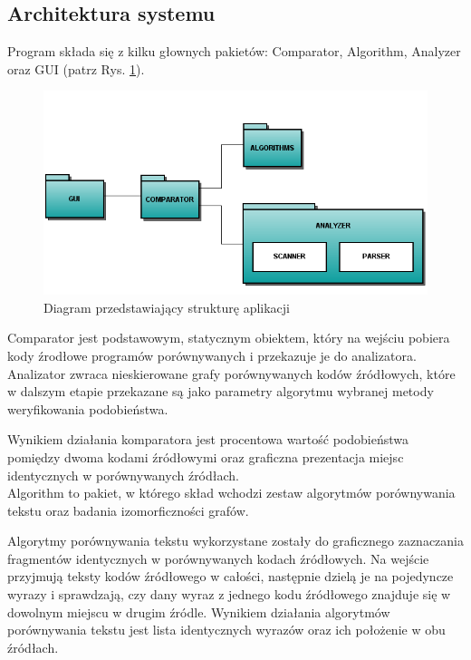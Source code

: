 \documentclass[a4paper,12pt]{article}
\begin{document}
\subsection{Architektura systemu}

Program składa się z kilku głownych pakietów: Comparator, Algorithm, Analyzer oraz GUI (patrz Rys. \ref{fig:gui}).

\begin{figure}[!h]
\centering
\includegraphics[scale=0.65]{gfx/packagediagram.png}
\caption{Diagram przedstawiający strukturę aplikacji}
\label{fig:gui}
\end{figure}

Comparator jest podstawowym, statycznym obiektem, który na wejściu pobiera kody źrodłowe programów porównywanych i przekazuje je do analizatora. Analizator zwraca nieskierowane grafy porównywanych kodów źródłowych, które w dalszym etapie przekazane są jako parametry algorytmu wybranej metody weryfikowania podobieństwa. 

Wynikiem działania komparatora jest procentowa wartość podobieństwa pomiędzy dwoma kodami źródłowymi oraz graficzna prezentacja miejsc identycznych w porównywanych źródłach.
\\

Algorithm to pakiet, w którego skład wchodzi zestaw algorytmów porównywania tekstu oraz badania izomorficzności grafów. 

Algorytmy porównywania tekstu wykorzystane zostały do graficznego zaznaczania fragmentów identycznych w porównywanych kodach źródłowych. Na wejście przyjmują teksty kodów źródłowego w całości, następnie dzielą je na pojedyncze wyrazy i sprawdzają, czy dany wyraz z jednego kodu źródłowego znajduje się w dowolnym miejscu w drugim źródle. Wynikiem działania algorytmów porównywania tekstu jest lista identycznych wyrazów oraz ich położenie w obu źródłach.
\end{document}
